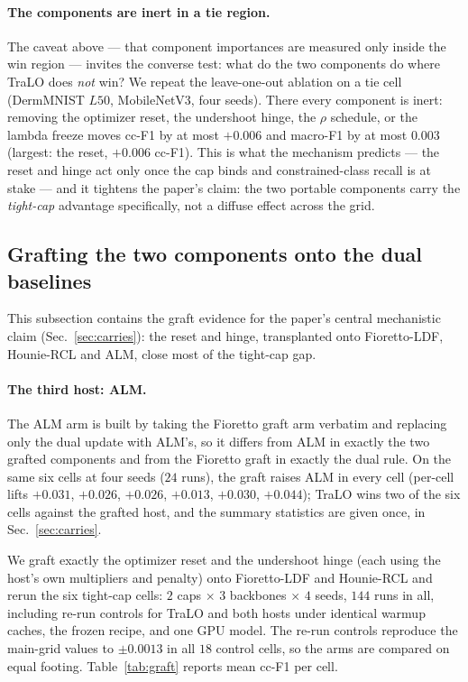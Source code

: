 \documentclass[10pt]{article}
\begin{document}
{
\paragraph{The components are inert in a tie region.}
The caveat above --- that component importances are measured only inside the win
region --- invites the converse test: what do the two components do where TraLO does
\emph{not} win? We repeat the leave-one-out ablation on a tie cell (DermMNIST $L50$,
MobileNetV3, four seeds). There every component is inert: removing the optimizer
reset, the undershoot hinge, the $\rho$ schedule, or the lambda freeze moves cc-F1 by
at most $+0.006$ and macro-F1 by at most $0.003$ (largest: the reset, $+0.006$ cc-F1).
This is what the mechanism predicts --- the reset and hinge act only once the cap binds
and constrained-class recall is at stake --- and it tightens the paper's claim: the two
portable components carry the \emph{tight-cap} advantage specifically, not a diffuse
effect across the grid.}



\subsection{Grafting the two components onto the dual baselines}
\label{app:graft}

This subsection contains the graft evidence for the paper's central
mechanistic claim (Sec.~\ref{sec:carries}): the reset and hinge,
transplanted onto Fioretto-LDF{,} Hounie-RCL{ and ALM},
close most of the
tight-cap gap. 

{
\paragraph{The third host: ALM.}
{The ALM arm is built} by taking the Fioretto graft arm verbatim and replacing
only the dual update with ALM's, so it differs from ALM in exactly the two
grafted components and from the Fioretto graft in exactly the dual rule. On the
same six cells at four seeds ($24$ runs), the graft raises ALM in every cell{ (per-cell lifts} $+0.031$, $+0.026$, $+0.026$, $+0.013$, $+0.030$,
$+0.044$){; TraLO wins two of the six cells against the
grafted host, and the summary statistics are given once, in
Sec.~\ref{sec:carries}.}}

 We graft exactly the optimizer reset and the
undershoot hinge (each using the host's own multipliers and penalty)
onto Fioretto-LDF and Hounie-RCL and rerun the six tight-cap cells:
$2$ caps $\times$ $3$ backbones $\times$ $4$ seeds, $144$ runs in all,
including re-run controls for TraLO and both hosts under identical
warmup caches, the frozen recipe, and one GPU model. The re-run
controls reproduce the main-grid values to $\pm0.0013$ in all $18$
control cells, so the arms are compared on equal footing.
Table~\ref{tab:graft} reports mean cc-F1 per cell.
\end{document}
